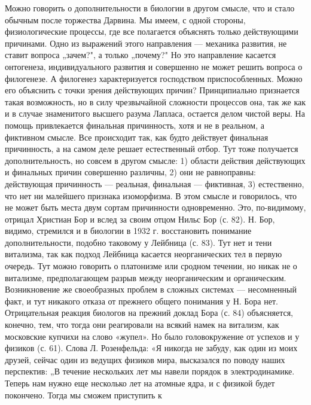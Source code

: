 Можно  говорить  о  дополнительности   в  биологии  в  другом  смысле,
что  и  стало обычным  после  торжества  Дарвина.  Мы имеем,  с  одной
стороны, физиологические процессы, где все полагается объяснять только
действующими  причинами.  Одно  из  выражений  этого  направления  ---
механика  развития, не  ставит  вопроса „зачем?",  а только  „почему?"
Но  это  направление  касается  онтогенеза,  индивидуального  развития
и  совершенно  не  может  решить вопроса  о  филогенезе.  А  филогенез
характеризуется  господством приспособленных.  Можно  его объяснить  с
точки  зрения  действующих   причин?  Принципиально  признается  такая
возможность,  но  в силу  чрезвычайной  сложности  процессов она,  так
же  как  и  в  случае знаменитого  высшего  разума  Лапласа,  остается
делом  чистой  веры.  На помощь  привлекается  финальная  причинность,
хотя  и  не  в  реальном,  а фиктивном  смысле.  Все  происходит  так,
как  будто действует  финальная причинность,  а на  самом деле  решает
естественный отбор. Тут тоже  получается дополнительность, но совсем в
другом  смысле: 1)  области  действия действующих  и финальных  причин
совершенно различны,  2) они  не равноправны:  действующая причинность
---  реальная, финальная  --- фиктивная,  3) естественно,  что нет  ни
малейшего  признака  изоморфизма.  В  этом смысле  и  говорилось,  что
не  может  быть  места  двум  сортам  причинности  одновременно.  Это,
по-видимому,  отрицал  Христиан  Бор  и вслед  за  своим  отцом  Нильс
Бор  (с.  82). Н.  Бор,  видимо,  стремился и  в  биологии  в 1932  г.
восстановить понимание  дополнительности, подобно таковому  у Лейбница
(с. 83).  Тут нет и тени  витализма, так как подход  Лейбница касается
неорганических тел в  первую очередь. Тут можно  говорить о платонизме
или сродном  течении, но никак  не о витализме,  предполагающем разрыв
между  неорганическим и  органическим.  Возникновение же  своеобразных
проблем в сложных системах --- несомненный факт, и тут никакого отказа
от  прежнего общего  понимания у  Н. Бора  нет. Отрицательная  реакция
биологов на прежний доклад Бора (с. 84) объясняется, конечно, тем, что
тогда  они реагировали  на всякий  намек на  витализм, как  московские
купчихи  на слово  «жупел».  Но  было головокружение  от  успехов и  у
физиков (с. 61). Слова Л. Розенфельда:  «Я никогда не забуду, как один
из моих  друзей, сейчас  один из ведущих  физиков мира,  высказался по
поводу наших перспектив: „В течение нескольких лет мы навели порядок в
электродинамике.  Теперь  нам  нужно  еще  несколько  лет  на  атомные
ядра,  и с  физикой  будет  покончено. Тогда  мы  сможем приступить  к
